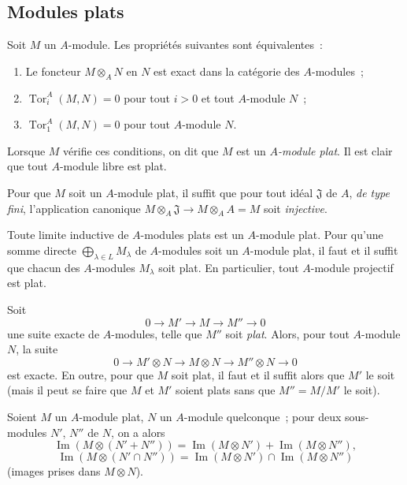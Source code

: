 \subsection{Modules plats}
\label{subsection:0.6.1-fr}

\begin{env}[6.1.1]
\label{0.6.1.1-fr}
Soit $M$ un $A$-module. Les propriétés suivantes sont équivalentes~:
\begin{enumerate}
  \item[$a)$] Le foncteur $M\otimes_A N$ en $N$ est exact dans la catégorie
    des $A$-modules~;
  \item[$b)$] $\operatorname{Tor}_i^A(M,N)=0$ pour tout $i>0$ et tout
    $A$-module $N$~;
  \item[$c)$] $\operatorname{Tor}_1^A(M,N)=0$ pour tout $A$-module $N$.
\end{enumerate}

Lorsque $M$ vérifie ces conditions, on dit que $M$ est un
\emph{$A$-module plat}. Il est clair que tout $A$-module libre est plat.

Pour que $M$ soit un $A$-module plat, il suffit que pour tout idéal
$\mathfrak{J}$ de $A$, \emph{de type fini}, l'application canonique
$M\otimes_A\mathfrak{J}\to M\otimes_A A=M$ soit \emph{injective}.
\end{env}

\begin{env}[6.1.2]
Toute limite inductive de $A$-modules plats est un $A$-module plat. Pour
qu'une somme directe $\bigoplus_{\lambda\in L}M_\lambda$ de $A$-modules soit
un $A$-module plat, il faut et il suffit que chacun des $A$-modules
$M_\lambda$ soit plat. En particulier, tout $A$-module projectif est plat.

Soit
\[
  0\longrightarrow M'\longrightarrow M\longrightarrow M''\longrightarrow 0
\]
une suite exacte de $A$-modules, telle que $M''$ soit \emph{plat}. Alors, pour
tout $A$-module $N$, la suite
\[
  0\longrightarrow M'\otimes N\longrightarrow M\otimes N
  \longrightarrow M''\otimes N\longrightarrow 0
\]
est exacte. En outre, pour que $M$ soit plat, il faut et il suffit alors que
$M'$ le soit (mais il peut se faire que $M$ et $M'$ soient plats sans que
$M''=M/M'$ le soit).
\end{env}

\begin{env}[6.1.3]
\label{0.6.1.3-fr}
Soient $M$ un $A$-module plat, $N$ un $A$-module quelconque~; pour deux
sous-modules $N'$, $N''$ de $N$, on a alors
\[
  \operatorname{Im}(M\otimes(N'+N''))
  =\operatorname{Im}(M\otimes N')+\operatorname{Im}(M\otimes N''),
\]
\[
  \operatorname{Im}(M\otimes(N'\cap N''))
  =\operatorname{Im}(M\otimes N')\cap\operatorname{Im}(M\otimes N'')
\]
(images prises dans $M\otimes N$).
\end{env}

